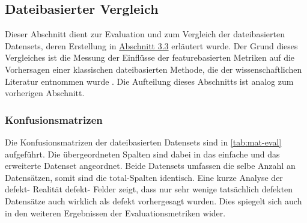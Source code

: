 \subsection{Dateibasierter Vergleich}
\label{classic-eval}

Dieser Abschnitt dient zur Evaluation und zum Vergleich der dateibasierten Datensets, deren Erstellung in \hyperref[new-datasets]{Abschnitt 3.3} erläutert wurde. Der Grund dieses Vergleiches ist die Messung der Einflüsse der featurebasierten Metriken auf die Vorhersagen einer klassischen dateibasierten Methode, die der wissenschaftlichen Literatur entnommen wurde \cite{Moser2008}. Die Aufteilung dieses Abschnitts ist analog zum vorherigen Abschnitt.

\subsubsection*{Konfusionsmatrizen}

Die Konfusionsmatrizen der dateibasierten Datensets sind in \autoref{tab:mat-eval} aufgeführt. Die übergeordneten Spalten sind dabei in das \glqq einfache\grqq{} und das erweiterte Datenset angeordnet. Beide Datensets umfassen die selbe Anzahl an Datensätzen, somit sind die \glqq total\grqq -Spalten identisch.
Eine kurze Analyse der \glqq defekt\grqq - \glqq Realität defekt\grqq - Felder zeigt, dass nur sehr wenige tatsächlich defekten Datensätze auch wirklich als defekt vorhergesagt wurden. Dies spiegelt sich auch in den weiteren Ergebnissen der Evaluationsmetriken wider.

